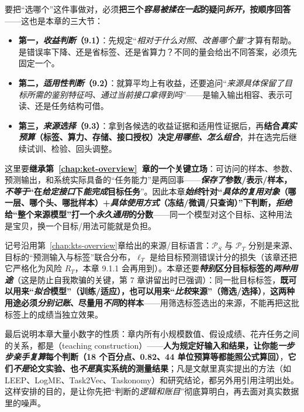 要把“选哪个”这件事做对，必须\textbf{把三个\emph{容易被揉在一起}的疑问\emph{拆开}，按顺序回答}——这也是本章的三大节：
\begin{itemize}\item \textbf{第一，\emph{收益判断}（9.1）}：先规定“\emph{相对于\emph{什么}对照}、\emph{改善\emph{哪个量}}”才算有帮助。是错误率下降、还是省标签、还是省算力？不同的量会给出不同答案，必须先固定一个。\item \textbf{第二，\emph{适用性判断}（9.2）}：就算平均上有收益，还要追问“\emph{来源\emph{具体保留了}目标所需的\emph{鉴别特征}吗、通过当前\emph{接口}拿得到吗}”——是输入输出相容、表示可读、还是任务结构可借。\item \textbf{第三，\emph{来源选择}（9.3）}：拿到各候选的收益证据和适用性证据后，再\textbf{结合\emph{真实预算}（标签、算力、存储、接口授权）决定\emph{用哪些、怎么组合}}，并在选完后继续试训、检验、回头调整。\end{itemize}
这里要\textbf{继承第~\ref{chap:ket-overview}~章的一个关键立场}：可访问的样本、参数、预测输出，和系统实际具备的“任务能力”是两回事——\textbf{\emph{保存了}参数/表示/样本，\emph{不等于}“在\emph{给定接口}下\emph{能完成}目标任务}”。因此本章\textbf{\emph{始终}针对“\emph{具体的复用对象}（哪一层、哪个头、哪批样本）+\emph{具体使用方式}（冻结/微调/只查询）”下判断，\emph{拒绝}给“整个来源模型”打一个\emph{永久通用}的分数}——同一个模型对这个目标、这种用法是宝贝，换一个目标/用法可能就是负担。

记号沿用第~\ref{chap:kts-overview}章给出的来源/目标语言：$\mathcal P_S$ 与 $\mathcal P_T$ 分别是来源、目标的“预测输入与标签”联合分布，$\ell_T$ 是给目标预测错误计分的损失（该章还把它严格化为风险 $R_T$，本章 9.1.1 会再用到）。本章还要\textbf{\emph{特别}区分目标标签的\emph{两种用途}}（这是防止自我欺骗的关键，第 7 章讲留出时已强调）：同一批目标标签，\textbf{既可以用来“\emph{拟合}模型”（训练/适应），也可以用来“\emph{比较}来源”（筛选/选择）}，\textbf{这两种用途必须\emph{分别记账}、尽量用\emph{不同}的样本}——用筛选标签选出的来源，不能再把这批标签上的成绩当独立效果。

最后说明本章大量小数字的性质：章内所有小规模数值、假设成绩、花卉任务之间的关系，都是（teaching construction）——\textbf{人为规定好输入和结果，让你能\emph{一步步亲手复算}每个判断（18 个百分点、0.82、44 单位预算等都能照公式算回）}，\textbf{它们\emph{不是}论文实验、也\emph{不是}真实系统的测量结果}；凡是文献里真实提出的方法（如 LEEP、LogME、Task2Vec、Taskonomy）和研究结论，都另外用引用注明出处。这样安排的目的，是让你先把“判断的\emph{逻辑和账目}”彻底算明白，再去面对真实数据里的噪声。

